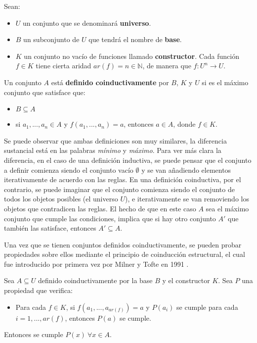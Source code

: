 \begin{definition}
Sean:
\begin{itemize}
\item $U$ un conjunto que se denominará \textbf{universo}.
\item $B$ un subconjunto  de $U$ que tendrá el nombre de \textbf{base}. 
\item $K$ un conjunto no vacío de funciones llamado \textbf{constructor}. Cada función $f \in K$ tiene cierta aridad $ar(f) = n \in \mathbb{N}$, de manera que $f : U^n \rightarrow U$.
\end{itemize}
Un conjunto $A$ está \textbf{definido coinductivamente} por $B$, $K$ y $U$ si es el máximo conjunto que satisface que:
\begin{itemize}
\item $B \subseteq A$
\item si $a_1, ..., a_n \in A$ y $f(a_1, ..., a_n) = a$, entonces $a \in A$, donde $f \in K$. 
\end{itemize}
\end{definition}

Se puede observar que ambas definiciones son muy similares, la diferencia sustancial está en las palabras \textit{mínimo} y \textit{máximo}. Para ver más clara la diferencia, en el caso de una definición inductiva, se puede pensar que el conjunto a definir comienza siendo el conjunto vacío $\emptyset$ y se van añadiendo elementos iterativamente de acuerdo con las reglas. En una definición coinductiva, por el contrario, se puede imaginar que el conjunto comienza siendo el conjunto de todos los objetos posibles (el universo $U$), e iterativamente se van removiendo los objetos que contradicen las reglas. El hecho de que en este caso $A$ sea el máximo conjunto que cumple las condiciones, implica que si hay otro conjunto $A'$ que también las satisface, entonces $A' \subseteq A$.

Una vez que se tienen conjuntos definidos coinductivamente, se pueden probar propiedades sobre ellos mediante el principio de coinducción estructural, el cual fue introducido por primera vez por Milner y Tofte en 1991 \cite{milner:1991}.

\begin{thm}
Sea $A \subseteq U$ definido coinductivamente por la base $B$ y el constructor $K$. Sea $P$ una propiedad que verifica:
\begin{itemize}
\item Para cada $f \in K$, si $f(a_1, ..., a_{ar(f)}) = a$ y $P(a_i)$ se cumple para cada $i = 1, ..., ar(f)$, entonces $P(a)$ se cumple. 
\end{itemize}
Entonces se cumple $P(x) \ \forall x \in A$.
\end{thm}

